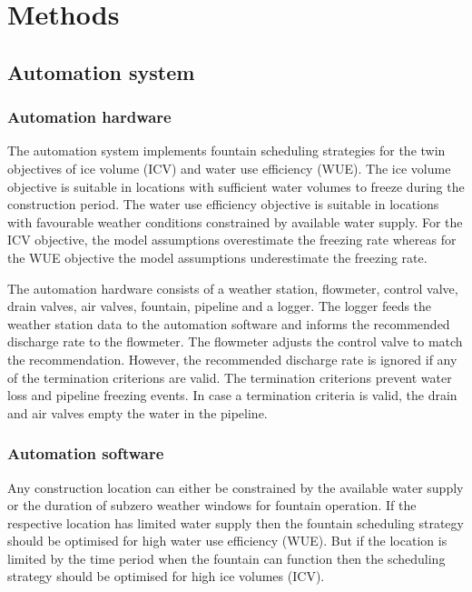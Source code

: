 \documentclass[tc, manuscript]{copernicus}
\begin{document}
\section{Methods}

\subsection{Automation system}

\subsubsection{Automation hardware}

The automation system implements fountain scheduling strategies for the twin objectives of ice volume (ICV) and
water use efficiency (WUE). The ice volume objective is suitable in locations with sufficient water volumes to
freeze during the construction period. The water use efficiency objective is suitable in locations with
favourable weather conditions constrained by available water supply. For the ICV objective, the model
assumptions overestimate the freezing rate whereas for the WUE objective the model assumptions underestimate the
freezing rate. 

The automation hardware consists of a weather station, flowmeter, control valve, drain valves, air valves,
fountain, pipeline and a logger. The logger feeds the weather station data to the automation software and
informs the recommended discharge rate to the flowmeter. The flowmeter adjusts the control valve to match the
recommendation. However, the recommended discharge rate is ignored if any of the termination criterions are
valid. The termination criterions prevent water loss and pipeline freezing events. In case a termination
criteria is valid, the drain and air valves empty the water in the pipeline.

\subsubsection{Automation software}

Any construction location can either be constrained by the available water supply or the duration of subzero
weather windows for fountain operation. If the respective location has limited water supply then the fountain
scheduling strategy should be optimised for high water use efficiency (WUE). But if the location is limited by
the time period when the fountain can function then the scheduling strategy should be optimised for high ice
volumes (ICV).
\end{document}
